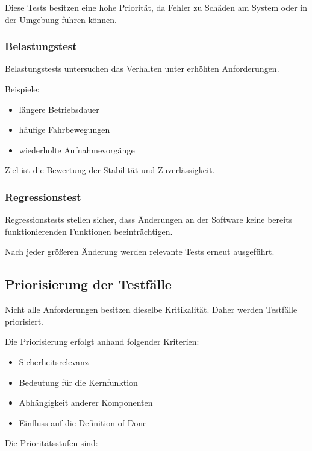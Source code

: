 Diese Tests besitzen eine hohe Priorität, da Fehler zu Schäden am System
oder in der Umgebung führen können.

\subsubsection{Belastungstest}\label{belastungstest}

Belastungstests untersuchen das Verhalten unter erhöhten Anforderungen.

Beispiele:

\begin{itemize}
\tightlist
\item
  längere Betriebsdauer
\item
  häufige Fahrbewegungen
\item
  wiederholte Aufnahmevorgänge
\end{itemize}

Ziel ist die Bewertung der Stabilität und Zuverlässigkeit.

\subsubsection{Regressionstest}\label{regressionstest}

Regressionstests stellen sicher, dass Änderungen an der Software keine
bereits funktionierenden Funktionen beeinträchtigen.

Nach jeder größeren Änderung werden relevante Tests erneut ausgeführt.

\subsection{Priorisierung der
Testfälle}\label{priorisierung-der-testfuxe4lle}

Nicht alle Anforderungen besitzen dieselbe Kritikalität. Daher werden
Testfälle priorisiert.

Die Priorisierung erfolgt anhand folgender Kriterien:

\begin{itemize}
\tightlist
\item
  Sicherheitsrelevanz
\item
  Bedeutung für die Kernfunktion
\item
  Abhängigkeit anderer Komponenten
\item
  Einfluss auf die Definition of Done
\end{itemize}

Die Prioritätsstufen sind:

